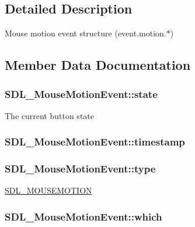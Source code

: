 \subsection{Detailed Description}
Mouse motion event structure (event.\-motion.$\ast$) 

\subsection{Member Data Documentation}
\hypertarget{struct_s_d_l___mouse_motion_event_a3f6e9bad9d959b824881ba09e05b7024}{
\subsubsection[{state}]{ S\-D\-L\-\_\-\-Mouse\-Motion\-Event\-::state}}\label{struct_s_d_l___mouse_motion_event_a3f6e9bad9d959b824881ba09e05b7024}
The current button state \hypertarget{struct_s_d_l___mouse_motion_event_af530bc0ef327ea6d497c5b1da119841c}{
\subsubsection[{timestamp}]{ S\-D\-L\-\_\-\-Mouse\-Motion\-Event\-::timestamp}}\label{struct_s_d_l___mouse_motion_event_af530bc0ef327ea6d497c5b1da119841c}
\hypertarget{struct_s_d_l___mouse_motion_event_a431dd28cd6db6a7335cf633dbeb80cfb}{
\subsubsection[{type}]{ S\-D\-L\-\_\-\-Mouse\-Motion\-Event\-::type}}\label{struct_s_d_l___mouse_motion_event_a431dd28cd6db6a7335cf633dbeb80cfb}
\hyperlink{_s_d_l__events_8h_a3b589e89be6b35c02e0dd34a55f3fccaa04c436ef80fef38fb77a89e0e9124c30}{S\-D\-L\-\_\-\-M\-O\-U\-S\-E\-M\-O\-T\-I\-O\-N} \hypertarget{struct_s_d_l___mouse_motion_event_a6f04c17b4305683915e2fd2dc3c36dbc}{
\subsubsection[{which}]{ S\-D\-L\-\_\-\-Mouse\-Motion\-Event\-::which}}\label{struct_s_d_l___mouse_motion_event_a6f04c17b4305683915e2fd2dc3c36dbc}
